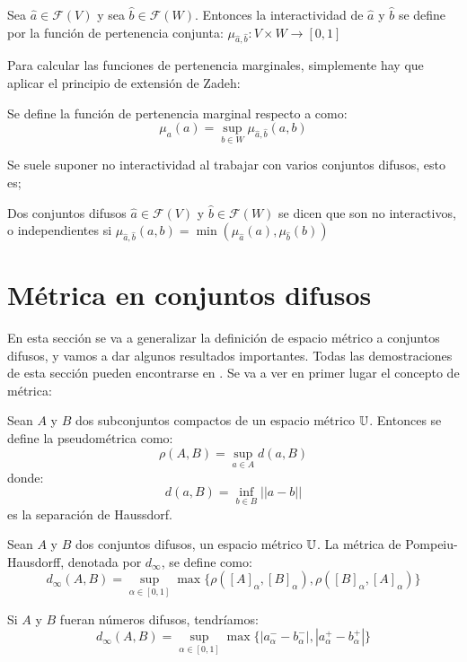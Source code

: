   \begin{definicion}
    Sea $\hat{a} \in \mathcal{F}(V)$ y sea $\hat{b} \in \mathcal{F}(W)$. Entonces la interactividad de $\hat{a}$ y $\hat{b}$ se define por la función de pertenencia conjunta: $\mu_{\hat{a}, \hat{b}} : V \times W \rightarrow [0, 1]$
  \end{definicion}
  Para calcular las funciones de pertenencia marginales, simplemente hay que aplicar el principio de extensión de Zadeh:

  \begin{definicion}
    Se define la función de pertenencia marginal respecto a como:
    \[
    \mu_a(a) = \sup\limits_{b \in W} \mu_{\hat{a}, \hat{b}} (a, b)
    \]
  \end{definicion}

  Se suele suponer no interactividad al trabajar con varios conjuntos difusos, esto es;

  \begin{definicion}
  	\label{nointeractivos}
    Dos conjuntos difusos $\hat{a} \in \mathcal{F}(V)$ y $\hat{b} \in \mathcal{F}(W)$ se dicen que son no interactivos, o independientes si $\mu_{\hat{a}, \hat{b}} (a, b) = \min(\mu_{\hat{a}}(a), \mu_{\hat{b}}(b))$
  \end{definicion}

  \section{Métrica en conjuntos difusos \cite{fuzzyintro}}
  En esta sección se va a generalizar la definición de espacio métrico a conjuntos difusos, y vamos a dar algunos resultados importantes. Todas las demostraciones de esta sección pueden encontrarse en \cite{apuntesfuzzy}. Se va a ver en primer lugar el concepto de métrica:

  \begin{definicion}[Pseudométrica]
    Sean $A$ y $B$ dos subconjuntos compactos de un espacio métrico $\mathbb U$. Entonces se define la pseudométrica como:
    \[
    \rho(A, B) = \sup\limits_{a \in A} d(a, B)
    \]
    donde:
    \[
    d(a, B) = \inf\limits_{b \in B} ||a-b||
    \]
    es la separación de Haussdorf.
  \end{definicion}

  \begin{definicion}
    \label{def:metricadifusa}
    Sean $A$ y $B$ dos conjuntos difusos, un espacio métrico $\mathbb U$. La métrica de Pompeiu-Hausdorff, denotada por $d_\infty$, se define como:
    \[
    d_\infty(A, B) = \sup\limits_{\alpha \in [0, 1]} \max\{\rho([A]_\alpha, [B]_\alpha), \rho([B]_\alpha,  [A]_\alpha)\}
    \]
    
    Si $A$ y $B$ fueran números difusos, tendríamos:
    \[
    d_\infty(A, B) = \sup\limits_{\alpha \in [0, 1]} \max\{|a_\alpha^- - b_\alpha^-|, |a_\alpha^+ - b_\alpha^+|\}
    \]
  \end{definicion}

